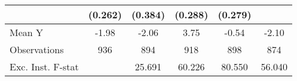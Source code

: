{\begin{tabular}{l*{5}{c}}
            &     (0.262)         &     (0.384)         &     (0.288)         &     (0.279)         &                     \\
\midrule
Mean Y      &       -1.98         &       -2.06         &        3.75         &       -0.54         &       -2.10         \\
Observations&         936         &         894         &         918         &         898         &         874         \\
Exc. Inst. F-stat&                     &      25.691         &      60.226         &      80.550         &      56.040         \\
\bottomrule
\end{tabular}
}
